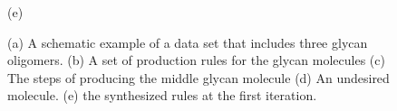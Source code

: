 \begin{figure}[ht!]
\begin{minipage}{0.75\linewidth}
    (e)
  \end{minipage}


  
  \vspace{-3mm}
  \caption{(a) A schematic example of a data set that includes three glycan oligomers.
    (b) A set of production rules for the glycan molecules
    (c) The steps of producing the middle glycan molecule
    (d) An undesired molecule.
    (e) the synthesized rules at the first iteration.
  }
  \label{fig:ex-gly}
  \vspace{-9mm}
\end{figure}

